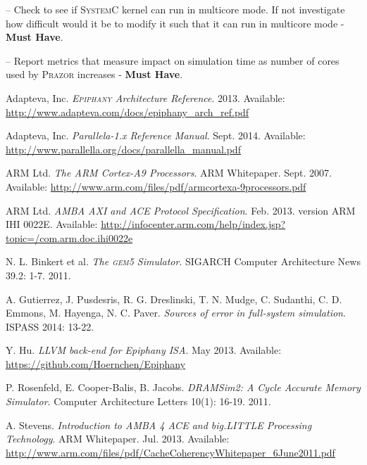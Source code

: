 \documentclass{hitec}
\let\oldmarginpar\marginpar
\renewcommand\marginpar[1]{\-\oldmarginpar[\raggedleft #1]%
{\raggedright #1}}
\newenvironment{checklist}{%
  \begin{list}{}{}%
  \let\olditem\item
  \renewcommand\item{\olditem -- \marginpar{$\Box$} }
  \newcommand\checkeditem{\olditem -- \marginpar{$\CheckedBox$} }
}{%
  \end{list}
}
\begin{document}
\begin{checklist}
\item Check to see if \textsc{SystemC} kernel can run in multicore
  mode. If not investigate how difficult would it be to modify it such
  that it can run in multicore mode - \textbf{Must Have}.
\item Report metrics that measure impact on simulation time as number
  of cores used by \textsc{Prazor} increases - \textbf{Must Have}. 
\end{checklist}

\begin{thebibliography}{9}

  Adapteva, Inc.
  \emph{\textsc{Epiphany} Architecture Reference}.
  2013. Available: \url{http://www.adapteva.com/docs/epiphany_arch_ref.pdf}

  Adapteva, Inc.
  \emph{Parallela-1.x Reference Manual}.
  Sept. 2014. Available: \url{http://www.parallella.org/docs/parallella_manual.pdf}

  ARM Ltd.
  \emph{The ARM Cortex-A9 Processors}.
  ARM Whitepaper. Sept. 2007. Available:
  \url{http://www.arm.com/files/pdf/armcortexa-9processors.pdf}

  ARM Ltd.
  \emph{AMBA AXI and ACE Protocol Specification}.
  Feb. 2013. version ARM IHI 0022E. Available:
  \url{http://infocenter.arm.com/help/index.jsp?topic=/com.arm.doc.ihi0022e}

  N. L. Binkert et al.
  \emph{The \textsc{gem5} Simulator}.
  SIGARCH Computer Architecture News 39.2: 1-7. 2011. 

  A. Gutierrez, J. Pusdesris, R. G. Dreslinski, T. N. Mudge, C. Sudanthi,  C. D. Emmons, M. Hayenga, N. C. Paver.
  \emph{Sources of error in full-system simulation}.
  ISPASS 2014: 13-22. 

  Y. Hu.
  \emph{LLVM back-end for Epiphany ISA}.
  May 2013. Available: \url{https://github.com/Hoernchen/Epiphany}

  P. Rosenfeld, E. Cooper-Balis, B. Jacobs.
  \emph{DRAMSim2: A Cycle Accurate Memory Simulator}.
  Computer Architecture Letters 10(1): 16-19.
  2011.

  A. Stevens.
  \emph{Introduction to AMBA 4 ACE and big.LITTLE Processing
    Technology}.
  ARM Whitepaper. Jul. 2013. Available: \url{http://www.arm.com/files/pdf/CacheCoherencyWhitepaper_6June2011.pdf}

\end{thebibliography}
\end{document}
